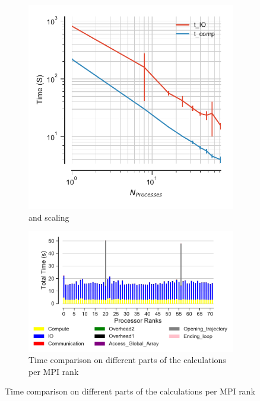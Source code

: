 \begin{figure}[ht!]
\begin{subfigure}{.4\textwidth}
  \includegraphics[width=\linewidth]{figures/RMSD-ga4py-time_IO_comparison.pdf}
\caption{\tcomp and \tIO scaling}
\label{fig:ScalingComputeIO-ga4py}
\end{subfigure}
\hfill
\begin{subfigure} {.5\textwidth}
  \includegraphics[width=\linewidth]{figures/RMSD-ga4py-BarPlot-rank-comparison_72_1.pdf}
  \caption{Time comparison on different parts of the calculations per MPI rank}
  \label{fig:MPIranks-ga4py}
\end{subfigure}


\end{figure}
